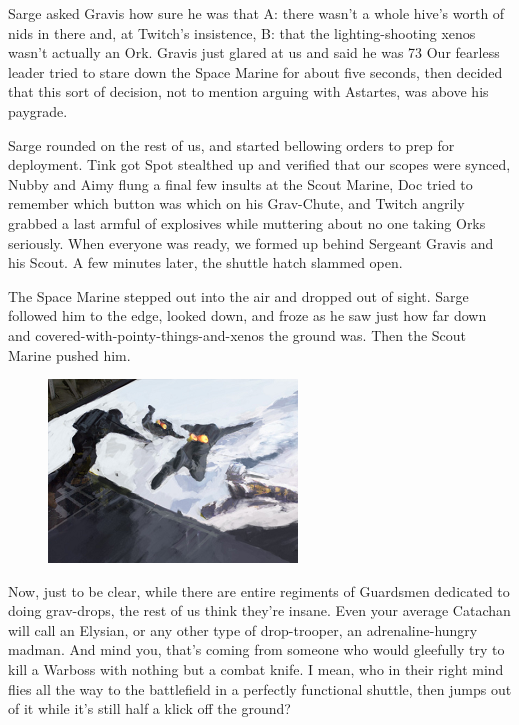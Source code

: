 Sarge asked Gravis how sure he was that A: 
there wasn't a whole hive's worth of nids in there and, at Twitch's insistence, B: 
that the lighting-shooting xenos wasn't actually an Ork. 
Gravis just glared at us and said he was 73%
Our fearless leader tried to stare down the Space Marine for about five seconds, then decided that this sort of decision, not to mention arguing with Astartes, was above his paygrade.

Sarge rounded on the rest of us, and started bellowing orders to prep for deployment. 
Tink got Spot stealthed up and verified that our scopes were synced, Nubby and Aimy flung a final few insults at the Scout Marine, Doc tried to remember which button was which on his Grav-Chute, and Twitch angrily grabbed a last armful of explosives while muttering about no one taking Orks seriously. 
When everyone was ready, we formed up behind Sergeant Gravis and his Scout. 
A few minutes later, the shuttle hatch slammed open.

The Space Marine stepped out into the air and dropped out of sight. 
Sarge followed him to the edge, looked down, and froze as he saw just how far down and covered-with-pointy-things-and-xenos the ground was. 
Then the Scout Marine pushed him.

\begin{figure}
	\begin{center}
		\includegraphics[width=\figwidth]{pics/12/36.png}
	\end{center}
\end{figure}
Now, just to be clear, while there are entire regiments of Guardsmen dedicated to doing grav-drops, the rest of us think they're insane. 
Even your average Catachan will call an Elysian, or any other type of drop-trooper, an adrenaline-hungry madman. 
And mind you, that's coming from someone who would gleefully try to kill a Warboss with nothing but a combat knife. 
I mean, who in their right mind flies all the way to the battlefield in a perfectly functional shuttle, then jumps out of it while it's still half a klick off the ground? 


